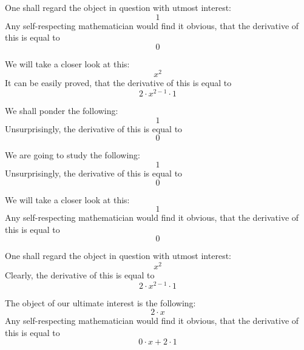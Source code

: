 \documentclass{article}
\begin{document}
One shall regard the object in question with utmost interest:
\begin{equation}
1 
\end{equation}
Any self-respecting mathematician would find it obvious, that the derivative of this is equal to
\begin{equation}
0 
\end{equation}

We will take a closer look at this:
\begin{equation}
x ^{2 } 
\end{equation}
It can be easily proved, that the derivative of this is equal to
\begin{equation}
2 \cdot x ^{2 - 1 } \cdot 1 
\end{equation}

We shall ponder the following:
\begin{equation}
1 
\end{equation}
Unsurprisingly, the derivative of this is equal to
\begin{equation}
0 
\end{equation}

We are going to study the following:
\begin{equation}
1 
\end{equation}
Unsurprisingly, the derivative of this is equal to
\begin{equation}
0 
\end{equation}

We will take a closer look at this:
\begin{equation}
1 
\end{equation}
Any self-respecting mathematician would find it obvious, that the derivative of this is equal to
\begin{equation}
0 
\end{equation}

One shall regard the object in question with utmost interest:
\begin{equation}
x ^{2 } 
\end{equation}
Clearly, the derivative of this is equal to
\begin{equation}
2 \cdot x ^{2 - 1 } \cdot 1 
\end{equation}

The object of our ultimate interest is the following:
\begin{equation}
2 \cdot x 
\end{equation}
Any self-respecting mathematician would find it obvious, that the derivative of this is equal to
\begin{equation}
0 \cdot x + 2 \cdot 1 
\end{equation}
\end{document}
